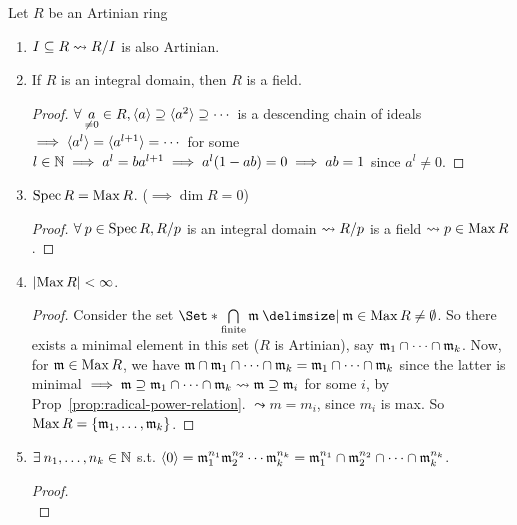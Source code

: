 \begin{prop} \label{artin-ring-basic-property}
  Let $R$ be an Artinian ring
  \begin{enumerate}[(1)]
    \item $I \subseteq R \leadsto {R}/{I}$ is also Artinian.
    \item If $R$ is an integral domain, then $R$ is a field.
      \begin{proof}
        $\forall \underset{\ne 0}{a} \in R, \gen{a} \supseteq \gen{a^2} \supseteq \dotsm$
        is a descending chain of ideals $\implies \langle a^l\rangle = \langle a^{l+1}\rangle = \dotsm$
        for some $l \in \mathbb{N} \implies a^l = ba^{l+1} \implies a^l(1 - ab) = 0
        \implies ab = 1$ since $a^l \ne 0$.
      \end{proof}
    \item $\operatorname{Spec} R = \operatorname{Max} R$. ($\implies \dim R = 0$)
      \begin{proof}
        $\forall p \in \Spec R, \quot{R}{p}$ is an integral domain
        $\leadsto {R}/{p}$ is a field $\leadsto p \in \operatorname{Max} R$.
      \end{proof}
    \item $\lvert\operatorname{Max} R\rvert < \infty$.
      \begin{proof}
        Consider the set $\Set*{ \bigcap\limits_{\text{finite}} \mf \given \mf \in \Max R}
        \ne \emptyset$. So there exists a minimal element in this set ($R$ is Artinian),
        say $\mathfrak{m}_1 \cap \dots \cap \mathfrak{m}_k$.  Now, for $\mathfrak{m} \in \operatorname{Max} R$, we have
        $\mathfrak{m}\cap \mathfrak{m}_1\cap \dots \cap\mathfrak{m}_k = \mathfrak{m}_1\cap \dots \cap\mathfrak{m}_k$ since the
        latter is minimal $\implies \mathfrak{m} \supseteq \mathfrak{m}_1\cap \dots\cap\mathfrak{m}_k
        \leadsto \mathfrak{m} \supseteq \mathfrak{m}_i$ for some $i$, by Prop~\ref{prop:radical-power-relation}.
        $\leadsto m = m_i$, since $m_i$ is max. So $\operatorname{Max} R = \lbrace\mathfrak{m}_1, \dots, \mathfrak{m}_k\rbrace$.
      \end{proof}
    \item $\exists n_1, \dots, n_k \in \Nb$ s.t.
      $\langle0\rangle = \mathfrak{m}_1^{n_1}\mathfrak{m}_2^{n_2} \dotsm \mathfrak{m}_k^{n_k}
      = \mathfrak{m}_1^{n_1}\cap \mathfrak{m}_2^{n_2} \cap \dots \cap \mathfrak{m}_k^{n_k}$.
      \begin{proof} $ $\\
\end{proof}
\end{enumerate}
\end{prop}

